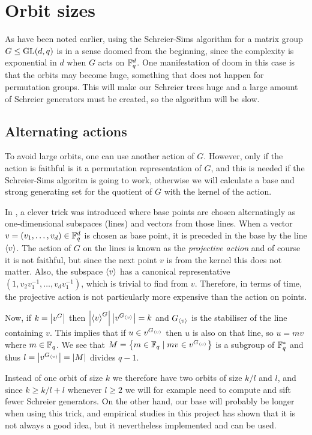 \section{Orbit sizes}
As have been noted earlier, using the Schreier-Sims algorithm for a
matrix group $G \leq \operatorname{GL}(d, q)$ is in a sense doomed from the
beginning, since the complexity is exponential in $d$ when $G$ acts on
$\mathbb{F}_q^d$. One manifestation of doom in this case is that the orbits
may become huge, something that does not happen for permutation
groups. This will make our Schreier trees huge and a large amount of Schreier generators must be created, so the algorithm will be slow.

\subsection{Alternating actions}
To avoid large orbits, one can use another action of $G$. However,
only if the action is faithful is it a permutation representation of
$G$, and this is needed if the Schreier-Sims algoritm is going to
work, otherwise we will calculate a base and strong generating set for the quotient of $G$ with the kernel of the action.

In \cite{butler76}, a clever trick was introduced where base points are
chosen alternatingly as one-dimensional subspaces (lines) and vectors
from those lines. When a vector $v = (v_1, \dotsc, v_d) \in \mathbb{F}_q^d$ is
chosen as base point, it is preceded in the base by the line
$\left\langle v \right\rangle$. The action of $G$ on the lines is known as the
\emph{projective action} and of course it is not faithful, but since the next
point $v$ is from the kernel this does not matter. Also, the subspace
$\left\langle v \right\rangle$ has a canonical representative $(1, v_2 v_1^{-1}, \dotsc,
v_d v_1^{-1})$, which is trivial to find from $v$. Therefore, in terms
of time, the projective action is not particularly more expensive than the action on points.

Now, if $k = \left\lvert v^G \right\rvert$ then $\left\lvert \left\langle v \right\rangle^G \right\rvert \left\lvert v^{G_{\left\langle v \right\rangle}} \right\rvert = k$ and $G_{\left\langle v \right\rangle}$
is the stabiliser of the line containing $v$. This implies that if $u \in
v^{G_{\left\langle v \right\rangle}}$ then $u$ is also on that line, so $u = mv$ where $m
\in \mathbb{F}_q$. We see that $M = \left\lbrace m \in \mathbb{F}_q \mid mv \in v^{G_{\left\langle v \right\rangle}} \right\rbrace$ is a
subgroup of $\mathbb{F}_q^{*}$ and thus $l = \left\lvert v^{G_{\left\langle v \right\rangle}} \right\rvert = \left\lvert M \right\rvert$ divides $q - 1$.

Instead of one orbit of size $k$ we therefore have two orbits of size
$k/l$ and $l$, and since $k \geq k/l + l$ whenever $l \geq 2$ we will for
example need to compute and sift fewer Schreier generators. On the
other hand, our base will probably be longer when using this trick,
and empirical studies in this project has shown that it is not always
a good idea, but it nevertheless implemented and can be used.

